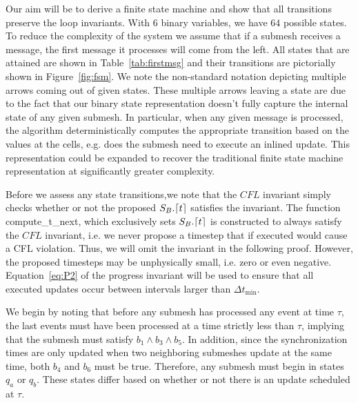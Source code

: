 Our aim will be to derive a finite state machine and show that all transitions preserve the loop invariants. With 6 binary variables, we have $64$ possible states. To reduce the complexity of the system we assume that if a submesh receives a message, the first message it processes will come from the left.
All states that are attained are shown in Table~\ref{tab:firstmsg} and their transitions are pictorially shown in Figure~\ref{fig:fsm}. We note the non-standard notation depicting multiple arrows coming out of given states. These multiple arrows leaving a state are due to the fact that our binary state representation doesn't fully capture the internal state of any given submesh. In particular, when any given message is processed, the algorithm deterministically computes the appropriate transition based on the values at the cells, e.g. does the submesh need to execute an inlined update. This representation could be expanded to recover the traditional finite state machine representation at significantly greater complexity. %

Before we assess any state transitions,we note that the $CFL$ invariant simply checks whether or not the proposed $S_B.\lceil t \rceil$ satisfies the invariant. The function {\sc compute\_t\_next}, which exclusively sets $S_B.\lceil t \rceil$ is constructed to always satisfy the $CFL$ invariant, i.e. we never propose a timestep that if executed would cause a CFL violation. Thus, we will omit the invariant in the following proof. However, the proposed timesteps may be unphysically small, i.e. zero or even negative. Equation~\eqref{eq:P2} of the progress invariant will be used to ensure that all executed updates occur between intervals larger than $\Delta t_{\min}$.

We begin by noting that before any submesh has processed any event at time $\tau$, the last events must have been processed at a time strictly less than $\tau$, implying that the submesh must satisfy $b_1\land b_3 \land b_5$. In addition, since the synchronization times are only updated when two neighboring submeshes update at the same time, both $b_4$ and $b_6$ must be true. Therefore, any submesh must begin in states $q_a$ or $q_b$. These states differ based on whether or not there is an update scheduled at $\tau$.

